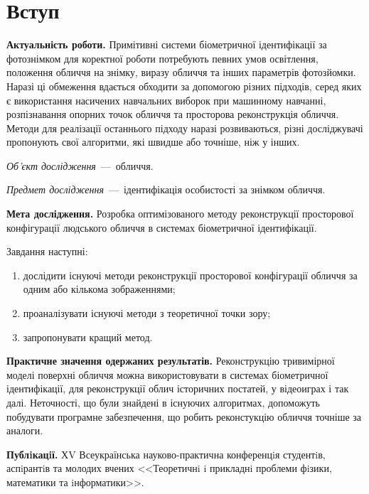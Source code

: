 \chapter*{Вступ}

\textbf{Актуальність роботи.}
Примітивні системи біометричної ідентифікації за фотознімком
для коректної роботи потребують певних умов
освітлення, положення обличчя на знімку, виразу обличчя
та інших параметрів фотозйомки.
Наразі ці обмеження вдається обходити за допомогою різних підходів,
серед яких є
використання насичених навчальних виборок при машинному навчанні,
розпізнавання опорних точок обличчя
та просторова реконструкція обличчя.
Методи для реалізації останнього підходу наразі розвиваються,
різні досліджувачі пропонують свої алгоритми,
які швидше або точніше, ніж у інших.

\textit{Об’єкт дослідження}~---~обличчя.

\textit{Предмет дослідження}~---~ідентифікація особистості за знімком обличчя.

\textbf{Мета дослідження.}
Розробка оптимізованого методу реконструкції просторової конфігурації
людського обличчя в системах біометричної ідентифікації.

Завдання наступні:
\begin{enumerate}
  \item
    дослідити існуючі методи реконструкції просторової конфігурації обличчя
    за одним або кількома зображеннями;
  \item
    проаналізувати існуючі методи з теоретичної точки зору;
  \item
    запропонувати кращий метод.
\end{enumerate}

\textbf{Практичне значення одержаних результатів.}
Реконструкцію тривимірної моделі поверхні обличчя
можна використовувати в системах біометричної ідентифікації,
для реконструкції облич історичних постатей,
у відеоиграх і так далі.
Неточності, що були знайдені в існуючих алгоритмах,
допоможуть побудувати програмне забезпечення,
що робить реконстукцію обличчя точніше за аналоги.

\textbf{Публiкацiї.}
ХV Всеукраїнська науково-практична конференцiя студентiв,
аспiрантiв та молодих вчених
<<Теоретичнi i прикладнi проблеми фiзики, математики та iнформатики>>.
